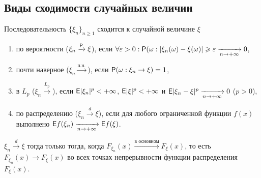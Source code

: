  \subsection*{Виды сходимости случайных величин}
 \begin{definition}
 	Последовательность $\{\xi_n \}_{n \geqslant 1}$ сходится к случайной величине $\xi$
 	\begin{enumerate}
 		\item {по вероятности ($\xi_n \xrightarrow{\P} \xi$), если $\forall \varepsilon > 0: \P(\omega:|\xi_n(\omega) - \xi(\omega)| \geqslant \varepsilon \limn 0$,}
 		\item {почти наверное ($\xi_n \xrightarrow{\text{п.н.}}$), если $\P(\omega: \xi_n \rightarrow \xi) = 1$,}
 		\item {в $L_p$ ($\xi_n \xrightarrow{L_p}$), если $\E |\xi_n |^p < + \infty$, $\E |\xi|^p < +\infty$ и $\E | \xi_n - \xi |^p \limn 0$ ($p > 0$),}
 		\item {по распределению ($\xi_n \xrightarrow{d} \xi$), если для любого ограниченной функции $f(x)$ выполнено $\E f (\xi_n) \limn \E f(\xi)$.}
 	\end{enumerate}
 \end{definition}
 \begin{theorem}[Александрова][б/д]
 	$\xi_n \xrightarrow{d} \xi$ тогда только тогда, когда $F_{\xi_n}(x) \xrightarrow{\text{в основном}} F_\xi (x)$, то есть $F_{\xi_n}(x) \rightarrow F_\xi(x)$ во всех точках непрерывности функции распределения $F_\xi(x)$. 
 \end{theorem}
